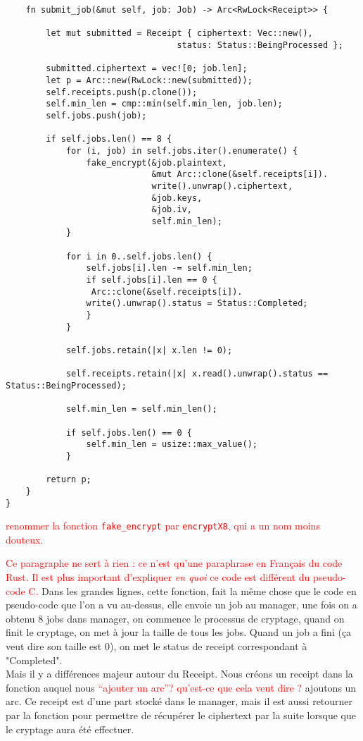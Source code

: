 \documentclass{article}
\newcommand{\TODO}[1]{\textcolor{red}{#1}}
\begin{document}
\begin{lstlisting}
    fn submit_job(&mut self, job: Job) -> Arc<RwLock<Receipt>> {

        let mut submitted = Receipt { ciphertext: Vec::new(),
                                  status: Status::BeingProcessed };

        submitted.ciphertext = vec![0; job.len];
        let p = Arc::new(RwLock::new(submitted));
        self.receipts.push(p.clone());
        self.min_len = cmp::min(self.min_len, job.len);
        self.jobs.push(job);

        if self.jobs.len() == 8 {
            for (i, job) in self.jobs.iter().enumerate() {
                fake_encrypt(&job.plaintext,
                             &mut Arc::clone(&self.receipts[i]).
                             write().unwrap().ciphertext,
                             &job.keys,
                             &job.iv,
                             self.min_len);
            }

            for i in 0..self.jobs.len() {
                self.jobs[i].len -= self.min_len;
                if self.jobs[i].len == 0 {
                 Arc::clone(&self.receipts[i]).
                write().unwrap().status = Status::Completed;
                }
            }

            self.jobs.retain(|x| x.len != 0);
            
            self.receipts.retain(|x| x.read().unwrap().status == Status::BeingProcessed);

            self.min_len = self.min_len();
            
            if self.jobs.len() == 0 {
                self.min_len = usize::max_value();
            }

        return p;
    }
}
\end{lstlisting}

\TODO{renommer la fonction \lstinline!fake_encrypt! par \lstinline!encryptX8!, qui a un nom moins douteux.}

\TODO{Ce paragraphe ne sert à rien : ce n'est qu'une paraphrase en Français du code Rust. Il est plus important d'expliquer \emph{en quoi} ce code est différent du pseudo-code C.} Dans les grandes lignes, cette fonction, fait la même chose que le code en pseudo-code que l'on a vu au-dessus, elle envoie un job au manager, une fois on a obtenu 8 jobs dans manager, on commence le processus de cryptage, quand on finit le cryptage, on met à jour la taille de tous les jobs. Quand un job a fini (ça veut dire son taille est 0), on met le status de receipt correspondant à "Completed".\\
Mais il y a différences majeur autour du Receipt. Nous créons un receipt dans la fonction auquel nous \TODO{``ajouter un arc''? qu'est-ce que cela veut dire ?} ajoutons un arc. Ce receipt est d'une part stocké dans le manager, mais il est aussi retourner par la fonction pour permettre de récupérer le ciphertext par la suite lorsque que le cryptage aura été effectuer.
\end{document}
